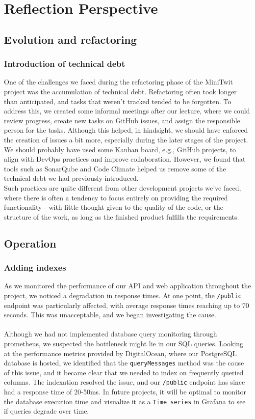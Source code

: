 \section{Reflection Perspective}
\subsection{Evolution and refactoring}\label{evolution}
\subsubsection{Introduction of technical debt}
One of the challenges we faced during the refactoring phase of the MiniTwit project was the accumulation of technical debt. Refactoring often took longer than anticipated, and tasks that weren’t tracked tended to be forgotten. To address this, we created some informal meetings after our lecture, where we could review progress, create new tasks on GitHub issues, and assign the responsible person for the tasks. Although this helped, in hindsight, we should have enforced the creation of issues a bit more, especially during the later stages of the project. We should probably have used some Kanban board, e.g., GitHub projects, to align with DevOps practices \cite{devopsculture} and improve collaboration. However, we found that tools such as SonarQube and Code Climate helped us remove some of the technical debt we had previously introduced.\\
Such practices are quite different from other development projects we've faced, where there is often a tendency to focus entirely on providing the required functionality - with little thought given to the quality of the code, or the structure of the work, as long as the finished product fulfills the requirements. 

\subsection{Operation}\label{operation}
\subsubsection{Adding indexes}
As we monitored the performance of our API and web application throughout the project, we noticed a degradation in response times. At one point, the \texttt{/public} endpoint was particularly affected, with average response times reaching up to 70 seconds. This was unacceptable, and we began investigating the cause.
\\\\
Although we had not implemented database query monitoring through prometheus, we suspected the bottleneck might lie in our SQL queries. Looking at the performance metrics provided by DigitalOcean, where our PostgreSQL database is hosted, we identified that the \texttt{queryMessages} method was the cause of this issue, and it became clear that we needed to index on frequently queried columns. The indexation resolved the issue, and our \texttt{/public} endpoint has since had a response time of 20-50ms. In future projects, it will be optimal to monitor the database execution time and visualize it as a \texttt{Time series} in Grafana to see if queries degrade over time.


